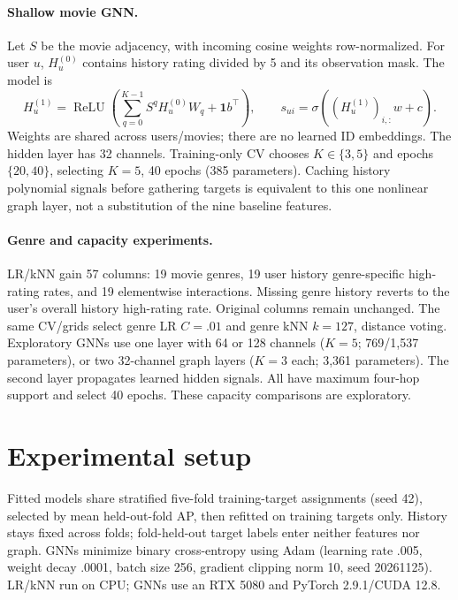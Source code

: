 \documentclass{article}
\begin{document}
\paragraph{Shallow movie GNN.}
Let $S$ be the movie adjacency, with incoming cosine weights row-normalized. For user $u$, $H_u^{(0)}$ contains history rating divided by 5 and its observation mask. The model is
\begin{equation}
H_u^{(1)}=\operatorname{ReLU}\!\left(\sum_{q=0}^{K-1}S^qH_u^{(0)}W_q+\mathbf{1}b^\top\right),
\qquad s_{ui}=\sigma\!\left((H_u^{(1)})_{i,:}w+c\right).
\label{eq:gnn}
\end{equation}
Weights are shared across users/movies; there are no learned ID embeddings. The hidden layer has 32 channels. Training-only CV chooses $K\in\{3,5\}$ and epochs $\{20,40\}$, selecting $K=5$, 40 epochs (385 parameters). Caching history polynomial signals before gathering targets is equivalent to this one nonlinear graph layer, not a substitution of the nine baseline features.

\paragraph{Genre and capacity experiments.}
LR/kNN gain 57 columns: 19 movie genres, 19 user history genre-specific high-rating rates, and 19 elementwise interactions. Missing genre history reverts to the user's overall history high-rating rate. Original columns remain unchanged. The same CV/grids select genre LR $C=.01$ and genre kNN $k=127$, distance voting. Exploratory GNNs use one layer with 64 or 128 channels ($K=5$; 769/1,537 parameters), or two 32-channel graph layers ($K=3$ each; 3,361 parameters). The second layer propagates learned hidden signals. All have maximum four-hop support and select 40 epochs. These capacity comparisons are exploratory.

\section{Experimental setup}
Fitted models share stratified five-fold training-target assignments (seed 42), selected by mean held-out-fold AP, then refitted on training targets only. History stays fixed across folds; fold-held-out target labels enter neither features nor graph. GNNs minimize binary cross-entropy using Adam (learning rate .005, weight decay .0001, batch size 256, gradient clipping norm 10, seed 20261125). LR/kNN run on CPU; GNNs use an RTX 5080 and PyTorch 2.9.1/CUDA 12.8.
\end{document}
